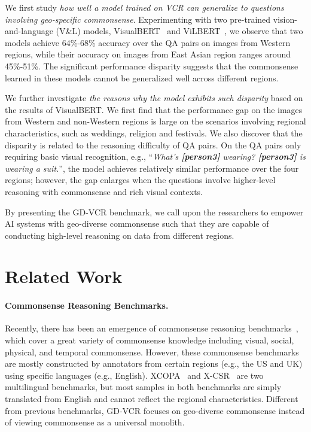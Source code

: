 \documentclass[11pt]{article}
\begin{document}
We first study \emph{how well a model trained on VCR can generalize to questions involving geo-specific commonsense}. Experimenting with two pre-trained vision-and-language (V\&L) models, VisualBERT~\cite{li2019visualbert} and ViLBERT~\cite{Lu2019ViLBERTPT}, we observe that two models achieve 64\%-68\% accuracy over the QA pairs on images from Western regions, while their accuracy on images from East Asian region ranges around 45\%-51\%. The significant performance disparity suggests that the commonsense learned in these models cannot be generalized well across different regions.

We further investigate \emph{the reasons why the model exhibits such disparity} based on the results of VisualBERT. We first find that the performance gap on the images from Western and non-Western regions is large on the scenarios involving regional characteristics, such as weddings, religion and festivals.
We also discover that the disparity is related to the reasoning difficulty of QA pairs. On the QA pairs only requiring basic visual recognition, e.g., ``\textit{What's \colorbox[rgb]{ .891,  .891,  .891}{\textbf{[person3]}} wearing? \colorbox[rgb]{ .891,  .891,  .891}{\textbf{[person3]}} is wearing a suit.}'', the model achieves relatively similar performance over the four regions; however, the gap enlarges when the questions involve higher-level reasoning with commonsense and rich visual contexts.

By presenting the GD-VCR benchmark, we call upon the researchers to empower AI systems with geo-diverse commonsense such that they are capable of conducting high-level reasoning on data from different regions.

\section{Related Work}
\paragraph{Commonsense Reasoning Benchmarks.}
Recently, there has been an emergence of commonsense reasoning benchmarks~\cite{zellers2019vcr,talmor-etal-2019-commonsenseqa,sap-etal-2019-social,zhou-etal-2019-going,huang-etal-2019-cosmos,bhagavatula2020abductive,Bisk2020}, which cover a great variety of commonsense knowledge including visual, social, physical, and temporal commonsense. 
However, these commonsense benchmarks are mostly constructed by annotators from certain regions (e.g., the US and UK) using specific languages (e.g., English). XCOPA~\cite{ponti-etal-2020-xcopa} and X-CSR~\cite{lin-etal-2021-common} are two multilingual benchmarks, but most samples in both benchmarks are simply translated from English and cannot reflect the regional characteristics. Different from previous benchmarks, GD-VCR focuses on geo-diverse commonsense instead of viewing commonsense as a universal monolith.
\end{document}
